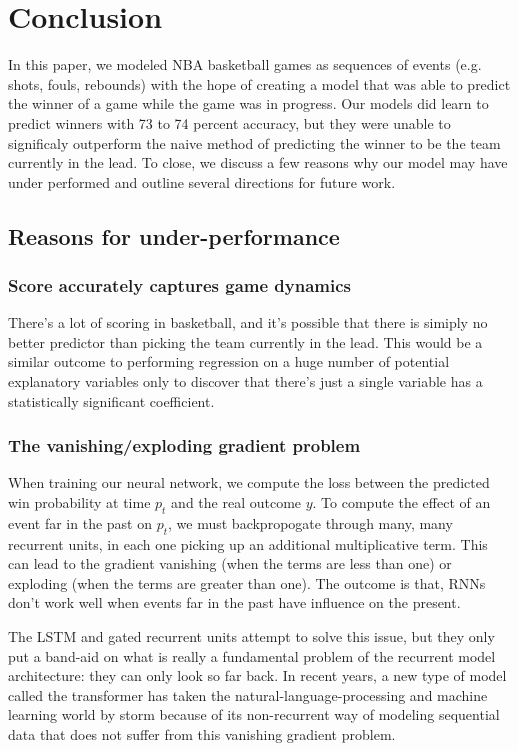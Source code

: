 \section{Conclusion}

In this paper, we modeled NBA basketball games as sequences of events (e.g. shots, fouls, rebounds) with the hope of creating a model that was able to predict the winner of a game while the game was in progress. Our models did learn to predict winners with 73 to 74 percent accuracy, but they were unable to significaly outperform the naive method of predicting the winner to be the team currently in the lead. To close, we discuss a few reasons why our model may have under performed and outline several directions for future work.

\subsection{Reasons for under-performance}

\subsubsection{Score accurately captures game dynamics}

There's a lot of scoring in basketball, and it's possible that there is simiply no better predictor than picking the team currently in the lead. This would be a similar outcome to performing regression on a huge number of potential explanatory variables only to discover that there's just a single variable has a statistically significant coefficient.

\subsubsection{The vanishing/exploding gradient problem}

When training our neural network, we compute the loss between the predicted win probability at time $p_t$ and the real outcome $y$. To compute the effect of an event far in the past on $p_t$, we must backpropogate through many, many recurrent units, in each one picking up an additional multiplicative term. This can lead to the gradient vanishing (when the terms are less than one) or exploding (when the terms are greater than one). The outcome is that, RNNs don't work well when events far in the past have influence on the present.

The LSTM and gated recurrent units attempt to solve this issue, but they only put a band-aid on what is really a fundamental problem of the recurrent model architecture: they can only look so far back. In recent years, a new type of model called the transformer \cite{attention-is-all-you-need} has taken the natural-language-processing and machine learning world by storm because of its non-recurrent way of modeling sequential data that does not suffer from this vanishing gradient problem.


